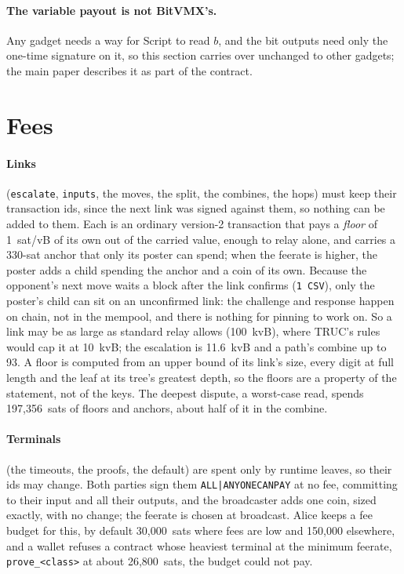 \documentclass[11pt]{article}
\newcommand{\tx}[1]{\texttt{#1}}
\begin{document}
\paragraph{The variable payout is not BitVMX's.} Any gadget needs a way
for Script to read $b$, and the bit outputs need only the one-time
signature on it, so this section carries over unchanged to other
gadgets; the main paper describes it as part of the contract.

\section{Fees}
\label{sec:fees}

\paragraph{Links} (\tx{escalate}, \tx{inputs}, the moves, the split,
the combines, the hops) must keep their transaction ids, since the next
link was signed against them, so nothing can be added to them. Each is
an ordinary version-2 transaction that pays a \emph{floor} of 1~sat/vB
of its own out of the carried value, enough to relay alone, and carries
a 330-sat anchor that only its poster can spend; when the feerate is
higher, the poster adds a child spending the anchor and a coin of its
own. Because the opponent's next move waits a block after the link
confirms (\texttt{1 CSV}), only the poster's child can sit on an
unconfirmed link: the challenge and response happen on chain, not in the
mempool, and there is nothing for pinning to work on. So a link may be
as large as standard relay allows (100~kvB), where TRUC's rules would
cap it at 10~kvB; the escalation is 11.6~kvB and a path's combine up to
93. A floor is computed from an upper bound of its link's size, every
digit at full length and the leaf at its tree's greatest depth, so the
floors are a property of the statement, not of the keys. The deepest
dispute, a worst-case read, spends 197,356~sats of floors and anchors,
about half of it in the combine.

\paragraph{Terminals} (the timeouts, the proofs, the default) are spent
only by runtime leaves, so their ids may change. Both parties sign them
\texttt{ALL|ANYONECANPAY} at no fee, committing to their input and all
their outputs, and the broadcaster adds one coin, sized exactly, with no
change; the feerate is chosen at broadcast. Alice keeps a fee budget for
this, by default 30,000~sats where fees are low and 150,000 elsewhere,
and a wallet refuses a contract whose heaviest terminal at the minimum
feerate, \tx{prove\_<class>} at about 26,800~sats, the budget could not
pay.
\end{document}
